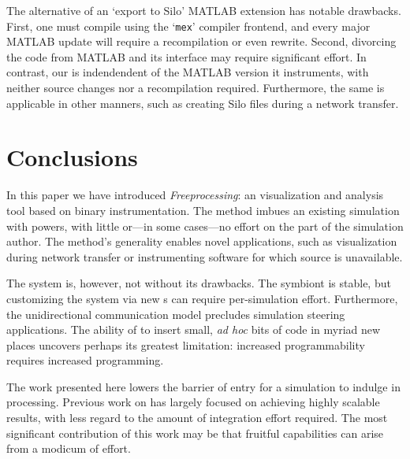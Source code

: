 The alternative of an `export to Silo' MATLAB extension has notable
drawbacks. First, one must compile using the `\texttt{mex}' compiler
frontend, and every major MATLAB update will require a recompilation or
even rewrite.  Second, divorcing the code from MATLAB and its interface
may require significant effort.
In contrast, our \freeprocessor{} is indendendent of the MATLAB version
it instruments, with neither source changes nor a recompilation
required.
Furthermore, the same \freeprocessor{} is applicable in other manners,
such as creating Silo files during a network transfer.


\section{Conclusions}
\label{sec:conclusion}

In this paper we have introduced \textit{Freeprocessing}: an \insitu{}
visualization and analysis tool based on binary instrumentation.  The
method imbues
an existing simulation with \insitu{} powers, with little or---in
some cases---no effort on the part of the simulation author.  The
method's generality enables novel applications, such as visualization
during network transfer or instrumenting software for which source is
unavailable.

The system is, however, not without its drawbacks.  The symbiont
is stable, but customizing the system via new
\freeprocessor{}s can require per-simulation effort.  Furthermore,
the unidirectional communication model precludes simulation steering
applications.
The ability of \freeprocessing{} to insert small,
\textit{ad hoc} bits of code in myriad new places uncovers perhaps
its greatest limitation: increased programmability requires increased
programming.

The work presented here lowers the barrier of entry for a
simulation to indulge in \insitu{} processing.  Previous work on
\insitu{} has largely focused on achieving highly scalable results,
with less regard to the amount of integration effort required.  The
most significant contribution of this work may be that fruitful
capabilities can arise from a modicum of effort.

